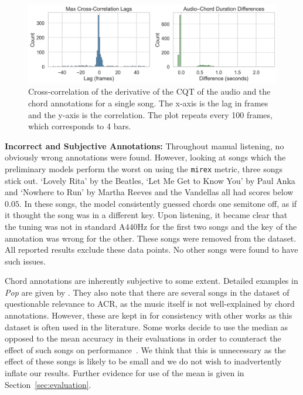 \begin{figure}[H]
    \centering
    \includegraphics[width=1.0\textwidth]{figures/duration_diffs_and_lags.png}
    \caption{Cross-correlation of the derivative of the CQT of the audio and the chord annotations for a single song. The x-axis is the lag in frames and the y-axis is the correlation. The plot repeats every 100 frames, which corresponds to 4 bars.}\label{fig:durations-and-lags}
\end{figure}

\textbf{Incorrect and Subjective Annotations:} Throughout manual listening, no obviously wrong annotations were found. However, looking at songs which the preliminary models perform the worst on using the \texttt{mirex} metric, three songs stick out. `Lovely Rita' by the Beatles, `Let Me Get to Know You' by Paul Anka and `Nowhere to Run' by Martha Reeves and the Vandellas all had scores below $0.05$. In these songs, the model consistently guessed chords one semitone off, as if it thought the song was in a different key. Upon listening, it became clear that the tuning was not in standard A440Hz for the first two songs and the key of the annotation was wrong for the other. These songs were removed from the dataset. All reported results exclude these data points. No other songs were found to have such issues.

Chord annotations are inherently subjective to some extent. Detailed examples in \emph{Pop} are given by \citet{FourTimelyInsights}. They also note that there are several songs in the dataset of questionable relevance to ACR, as the music itself is not well-explained by chord annotations. However, these are kept in for consistency with other works as this dataset is often used in the literature. Some works decide to use the median as opposed to the mean accuracy in their evaluations in order to counteract the effect of such songs on performance~\citep{StructuredTraining}. We think that this is unnecessary as the effect of these songs is likely to be small and we do not wish to inadvertently inflate our results. Further evidence for use of the mean is given in Section~\ref{sec:evaluation}.

